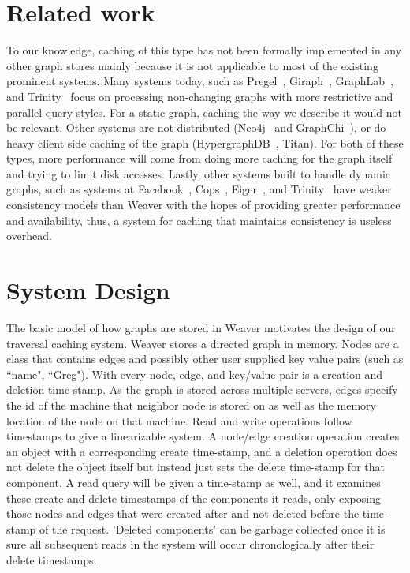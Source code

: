 \documentclass[letterpaper,twocolumn,11pt,tight]{article}
\begin{document}
\section{Related work}\label{sec:related}
To our knowledge, caching of this type has not been formally implemented in any other graph stores mainly because it is not applicable to most of the existing prominent systems. 
Many systems today, such as Pregel~\cite{pregel}, Giraph~\cite{giraph}, GraphLab~\cite{powergraph}, and Trinity~\cite{trinity} focus on processing non-changing graphs with more restrictive and parallel query styles. For a static graph, caching the way we describe it would not be relevant. Other systems are not distributed (Neo4j~\cite{neo4j} and GraphChi~\cite{graphchi}), or do heavy client side caching of the graph (HypergraphDB~\cite{hypergraphdb}, Titan\cite{titan,titan_slides}). For both of these types, more performance will come from doing more caching for the graph itself and trying to limit disk accesses. Lastly, other systems built to handle dynamic graphs, such as systems at Facebook~\cite{tao,memcache_fb}, Cops~\cite{cops}, Eiger~\cite{eiger}, and Trinity~\cite{trinity} have weaker consistency models than Weaver with the hopes of providing greater performance and availability, thus, a system for caching that maintains consistency is useless overhead.
\section{System Design}\label{sec:design}
The basic model of how graphs are stored in Weaver motivates the design of our traversal caching system. Weaver stores a directed graph in memory. Nodes are a class that contains edges and possibly other user supplied key value pairs (such as ``name", ``Greg"). With every node, edge, and key/value pair is a creation and deletion time-stamp.
As the graph is stored across multiple servers, edges specify the id of the machine that neighbor node is stored on as well as the memory location of the node on that machine.
Read and write operations follow timestamps to give a linearizable system. A node/edge creation operation creates an object with a corresponding create time-stamp, and a deletion operation does not delete the object itself but instead just sets the delete time-stamp for that component. A read query will be given a time-stamp as well, and it examines these create and delete timestamps of the components it reads, only exposing those nodes and edges that were created after and not deleted before the time-stamp of the request. 'Deleted components' can be garbage collected once it is sure all subsequent reads in the system will occur chronologically after their delete timestamps.
\end{document}
